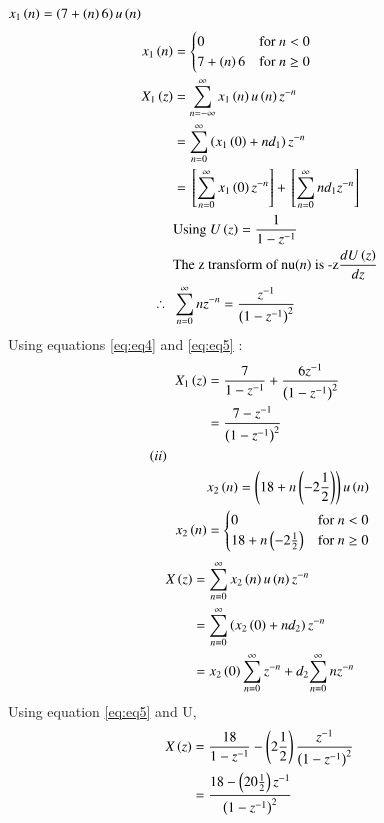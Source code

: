 \documentclass[journal,12pt,twocolumn]{IEEEtran}
\theoremstyle{remark}
\begin{document}
$x_{1}\left(n\right) = \left(7 + \left(n\right)6\right)u\left(n\right)$
\begin{align}
     x_{1}\left(n\right) & = \begin{cases} 
        0 & \text{for } n < 0 \\
        7 + \left(n\right)6 & \text{for } n \geq 0
    \end{cases}\\
X_{1}\left(z\right) &= \sum_{n=-\infty}^{\infty}x_{1}\left(n\right)u\left(n\right)z^{-n}\\
 &= \sum_{n=0}^{\infty}\left(x_{1}\left(0\right)+nd_{1}\right)z^{-n} \\
 &=  {}\left[\sum_{n=0}^{\infty}x_{1}\left(0\right)z^{-n}\right] + {}\left[\sum_{n=0}^{\infty}nd_{1}z^{-n}\right]\label{eq:eq4}\\
  &\text{Using } U\left(z\right) = \frac{1}{1 - z^{-1}} \\
&\text{The z transform of nu\ensuremath{\left(n\right)} is -z$\frac{dU\left(z\right)}{dz}$}\\
\therefore \hspace{2mm} & \sum_{n=0}^{\infty}nz^{-n} = \frac{z^{-1}}{\left(1-z^{-1}\right)^2}\label{eq:eq5}
\end{align}
Using equations \eqref{eq:eq4} and \eqref{eq:eq5} :\\
\begin{align}
X_{1}\brak{z} &= \frac{7}{1 - z^{-1}} + \frac{6z^{-1}}{\brak{1 - z^{-1}}^2}\\
 &= \frac{7 - z^{-1}}{\brak{1-z^{-1}}^2}\\
\textbf{\brak{ii}}\hspace{10mm}&\notag\\
&x_{2}\brak{n} = \brak{18 + n\brak{-2\frac{1}{2}}}u\brak{n} \\
     x_{2}\brak{n} & = \begin{cases}
        0 & \text{for } n < 0 \\
        18 + n\brak{-2\frac{1}{2}} & \text{for } n \geq 0
    \end{cases}
\end{align}
\begin{align}
X\left(z\right) &= \sum_{n=0}^{\infty}x_{2}\left(n\right)u\left(n\right)z^{-n}\\
 &= \sum_{n=0}^{\infty}\left(x_{2}\left(0\right) + nd_{2}\right)z^{-n} \\
 &=  x_{2}\left(0\right) \sum_{n=0}^{\infty}z^{-n} + d_{2}{\sum_{n=0}^{\infty}nz^{-n}}\label{eq:eq8}
 \end{align}
 Using equation \eqref{eq:eq5} and U,
 \begin{align} 
 X\left(z\right) &=  \frac{18}{1 - z^{-1}} - \left(2\frac{1}{2}\right)\frac{z^{-1}}{\left(1-z^{-1}\right)^2}\\
&= \frac{18 - \left(20\frac{1}{2}\right)z^{-1}}{\left(1 - z^{-1}\right)^2}
\end{align}
\end{document}

